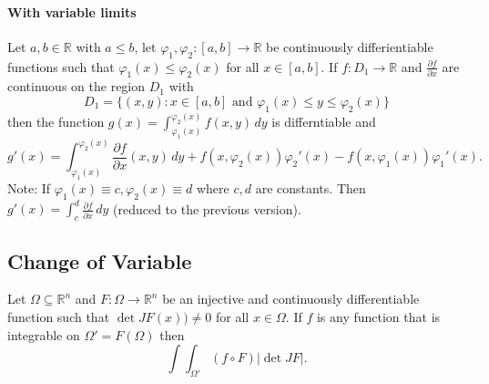 \paragraph{With variable limits}
Let \(a, b \in \mathbb R\) with \(a \leq b\), let \(\varphi_1, \varphi_2 : [a,b] \to \mathbb R\) be continuously differientiable functions such that \(\varphi_1(x) \leq \varphi_2(x)\) for all \(x\in[a,b]\). If \(f: D_1 \to \mathbb R\) and \(\frac{\partial f}{\partial x}\) are continuous on the region \(D_1\) with 
\[D_1 = \{(x,y) : x\in[a,b] \text{ and } \varphi_1(x) \leq y \leq \varphi_2(x)\}\]
then the function \(g(x) = \int_{\varphi_1(x)}^{\varphi_2(x)} f(x,y) \, dy\) is differntiable and 
\[g'(x) = \int_{\varphi_1(x)}^{\varphi_2(x)} \frac{\partial f}{\partial x}(x,y) \, dy + f(x, \varphi_2(x))\varphi_2'(x) - f(x, \varphi_1(x))\varphi_1'(x).\]
Note: If \(\varphi_1(x) \equiv c, \varphi_2(x) \equiv d\) where \(c, d\) are constants. Then \(g'(x) = \int_c^d \frac{\partial f}{\partial x} \, dy\) (reduced to the previous version).

\subsection{Change of Variable}
Let \(\Omega\subseteq\mathbb R^n\) and \(F:\Omega \to \mathbb R^n\) be an injective and continuously differentiable function such that \(\det JF(x)) \neq 0\) for all \(x \in \Omega\). If \(f\) is any function that is integrable on \(\Omega' = F(\Omega)\) then
\[\int\int_{\Omega'} (f \circ F)|\det JF|.\]
